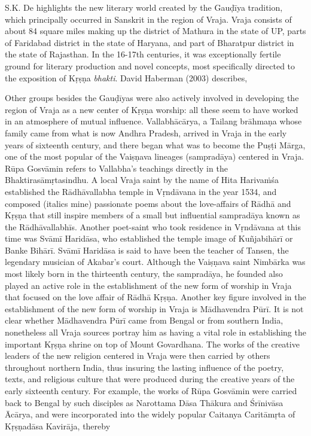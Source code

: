S.K. De highlights the new literary world created by the Gauḍīya tradition, which principally occurred in Sanskrit in the region of Vraja. Vraja consists of about 84 square miles making up the district of Mathura in the state of UP, parts of Faridabad district in the state of Haryana, and part of Bharatpur district in the state of Rajasthan. In the 16-17th centuries, it was exceptionally fertile ground for literary production and novel concepts, most specifically directed to the exposition of Kṛṣṇa {\sl bhakti}. David Haberman (2003) describes, 
\begin{myquote}
\eleven
Other groups besides the Gauḍīyas were also actively involved in developing the region of Vraja as a new center of Kṛṣṇa worship: all these seem to have worked in an atmosphere of mutual influence. Vallabhācārya, a Tailang brāhmaṇa whose family came from what is now Andhra Pradesh, arrived in Vraja in the early years of sixteenth century, and there began what was to become the Puṣṭi Mārga, one of the most popular of the Vaiṣṇava lineages (sampradāya) centered in Vraja. Rūpa Gosvāmin refers to Vallabha’s teachings directly in the Bhaktirasāmṛtasindhu. A local Vraja saint by the name of Hita Harivaṁśa established the Rādhāvallabha temple in Vṛndāvana in the year 1534, and composed (italics mine) passionate poems about the love-affairs of Rādhā and Kṛṣṇa that still inspire members of a small but influential sampradāya known as the Rādhāvallabhīs. Another poet-saint who took residence in Vṛndāvana at this time was Svāmī Haridāsa, who established the temple image of Kuñjabihārī or Banke Bihārī. Svāmī Haridāsa is said to have been the teacher of Tansen, the legendary musician of Akabar’s court. Although the Vaiṣṇava saint Nimbārka was most likely born in the thirteenth century, the sampradāya, he founded also played an active role in the establishment of the new form of worship in Vraja that focused on the love affair of Rādhā Kṛṣṇa. Another key figure involved in the establishment of the new form of worship in Vraja is Mādhavendra Pūrī. It is not clear whether Mādhavendra Pūrī came from Bengal or from southern India, nonetheless all Vraja sources portray him as having a vital role in establishing the important Kṛṣṇa shrine on top of Mount Govardhana. The works of the creative leaders of the new religion centered in Vraja were then carried by others throughout northern India, thus insuring the lasting influence of the poetry, texts, and religious culture that were produced during the creative years of the early sixteenth century. For example, the works of Rūpa Gosvāmin were carried back to Bengal by such disciples as Narottama Dāsa Thākura and Śrīnivāsa Ācārya, and were incorporated into the widely popular Caitanya Caritāmṛta of Kṛṣṇadāsa Kavirāja, thereby 
\end{myquote}
